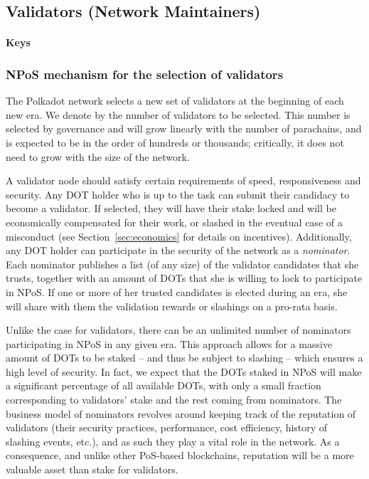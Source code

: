 \subsection{Validators (Network Maintainers)}\label{sec:validators}
 \paragraph{Keys}

 \subsubsection{NPoS mechanism for the selection of validators}

 The Polkadot network selects a new set of validators at the beginning of each new era. We denote by \nval the number of validators to be selected. This number is selected by governance and will grow linearly with the number of parachains, and is expected to be in the order of hundreds or thousands; critically, it does not need to grow with the size of the network.

A validator node should satisfy certain requirements of speed, responsiveness and security. Any DOT holder who is up to the task can submit their candidacy to become a validator. If selected, they will have their stake locked and will be economically compensated for their work, or slashed in the eventual case of a misconduct (see Section~\ref{sec:economics} for details on incentives). Additionally, any DOT holder can participate in the security of the network as a \emph{nominator}. Each nominator publishes a list (of any size) of the validator candidates that she trusts, together with an amount of DOTs that she is willing to lock to participate in NPoS. If one or more of her trusted candidates is elected during an era, she will share with them the validation rewards or slashings on a pro-rata basis. 

Unlike the case for validators, there can be an unlimited number of nominators participating in NPoS in any given era. This approach allows for a massive amount of DOTs to be staked -- and thus be subject to slashing -- which ensures a high level of security. In fact, we expect that the DOTs staked in NPoS will make a significant percentage of all available DOTs, with only a small fraction corresponding to validators' stake and the rest coming from nominators. The business model of nominators revolves around keeping track of the reputation of validators (their security practices, performance, cost efficiency, history of slashing events, etc.), and as such they play a vital role in the network. As a consequence, and unlike other PoS-based blockchains, reputation will be a more valuable asset than stake for validators.


